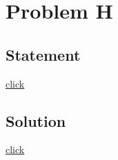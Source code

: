 \section{Problem H}
    \subsection{Statement}
        {\color{blue} \href{http://codeforces.com/problemset/problem/264/C}{click}}

    \subsection{Solution}
        {\color{blue} \href{http://codeforces.com/blog/entry/6478}{click}}

